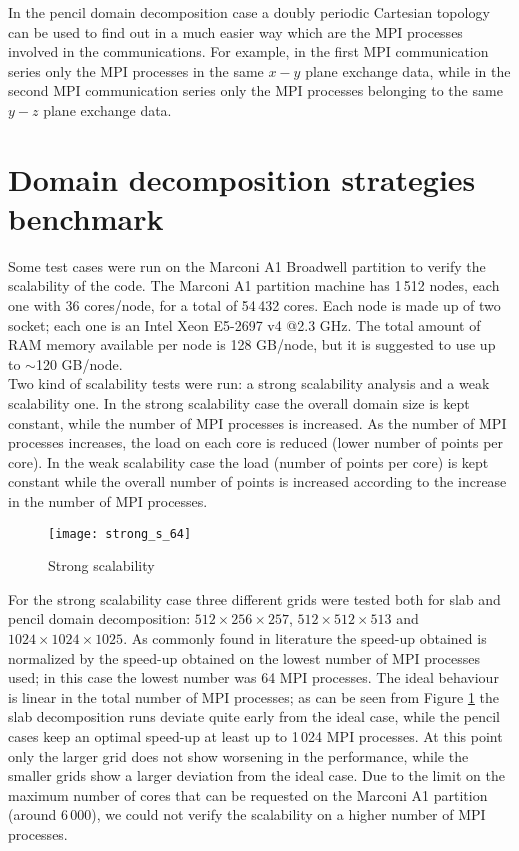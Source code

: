 In the pencil domain decomposition case a doubly periodic Cartesian topology can be used to find out in a much easier way which are the MPI processes involved in the communications. For example, in the first MPI communication series only the MPI processes in the same $x-y$ plane exchange data, while in the second MPI communication series only the MPI processes belonging to the same $y-z$ plane exchange data.


\section{Domain decomposition strategies benchmark}
\label{sec: benchmark}
Some test cases were run on the Marconi A1 Broadwell partition to verify the scalability of the code. The Marconi A1 partition machine has 1\,512 nodes, each one with 36 cores/node, for a total of 54\,432 cores. Each node is made up of two socket; each one is an Intel Xeon E5-2697 v4 @2.3 GHz. The total amount of RAM memory available per node is 128 GB/node, but it is suggested to use up to $\sim$120 GB/node.\\
Two kind of scalability tests were run: a strong scalability analysis and a weak scalability one. In the strong scalability case the overall domain size is kept constant, while the number of MPI processes is increased. As the number of MPI processes increases, the load on each core is reduced (lower number of points per core). In the weak scalability case the load (number of points per core) is kept constant while the overall number of points is increased according to the increase in the number of MPI processes.\\
\begin{figure}[h!]
\centering
\texttt{[image: strong\_s\_64]}
\caption{Strong scalability}
\label{fig: strong_s}
\end{figure}
For the strong scalability case three different grids were tested both for slab and pencil domain decomposition: $512\times256\times257$, $512\times512\times513$ and $1024\times1024\times1025$. As commonly found in literature the speed-up obtained is normalized by the speed-up obtained on the lowest number of MPI processes used; in this case the lowest number was 64 MPI processes. The ideal behaviour is linear in the total number of MPI processes; as can be seen from Figure \ref{fig: strong_s} the slab decomposition runs deviate quite early from the ideal case, while the pencil cases keep an optimal speed-up at least up to 1\,024 MPI processes. At this point only the larger grid does not show worsening in the performance, while the smaller grids show a larger deviation from the ideal case. Due to the limit on the maximum number of cores  that can be requested on the Marconi A1 partition (around 6\,000), we could not verify the scalability on a higher number of MPI processes.\\
